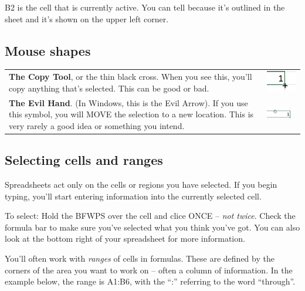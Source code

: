 \documentclass[
  letterpaper,
  DIV=11,
  numbers=noendperiod]{scrreprt}
\begin{document}
B2 is the cell that is currently active. You can tell because it's
outlined in the sheet and it's shown on the upper left corner.

\hypertarget{mouse-shapes}{%
\subsection{Mouse shapes}\label{mouse-shapes}}

\begin{longtable}[]{@{}
  >{\raggedright\arraybackslash}p{}
  >{\raggedright\arraybackslash}p{}@{}}
\toprule()
\endhead
\textbf{The Copy Tool}, or the thin black cross. When you see this,
you'll copy anything that's selected. This can be good or bad. &
\includegraphics{./images/xl-refresher-copy.png} \\
\textbf{The Evil Hand}. (In Windows, this is the Evil Arrow). If you use
this symbol, you will MOVE the selection to a new location. This is very
rarely a good idea or something you intend. &
\includegraphics{./images/xl-refresher-evilhand.png} \\
\bottomrule()
\end{longtable}

\hypertarget{selecting-cells-and-ranges}{%
\subsection{Selecting cells and
ranges}\label{selecting-cells-and-ranges}}

Spreadsheets act only on the cells or regions you have selected. If you
begin typing, you'll start entering information into the currently
selected cell.

To select: Hold the BFWPS over the cell and clice ONCE -- \emph{not
twice}. Check the formula bar to make sure you've selected what you
think you've got. You can also look at the bottom right of your
spreadsheet for more information.

You'll often work with \emph{ranges} of cells in formulas. These are
defined by the corners of the area you want to work on -- often a column
of information. In the example below, the range is A1:B6, with the ``:''
referring to the word ``through''.
\end{document}
